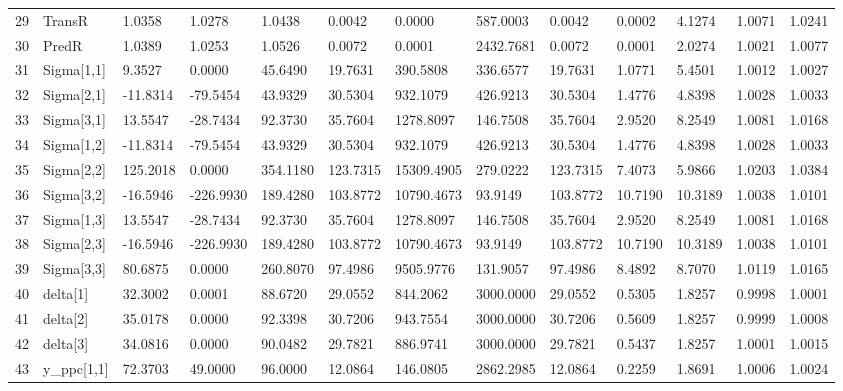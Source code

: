 \begin{table}[ht]
\begin{tabular}{rllllllllllll}
  29 & TransR &   1.0358 &    1.0278 &   1.0438 &   0.0042 &     0.0000 &  587.0003 &   0.0042 &  0.0002 &  4.1274 & 1.0071 &  1.0241 \\ 
  30 & PredR &   1.0389 &    1.0253 &   1.0526 &   0.0072 &     0.0001 & 2432.7681 &   0.0072 &  0.0001 &  2.0274 & 1.0021 &  1.0077 \\ 
  31 & Sigma[1,1] &   9.3527 &    0.0000 &  45.6490 &  19.7631 &   390.5808 &  336.6577 &  19.7631 &  1.0771 &  5.4501 & 1.0012 &  1.0027 \\ 
  32 & Sigma[2,1] & -11.8314 &  -79.5454 &  43.9329 &  30.5304 &   932.1079 &  426.9213 &  30.5304 &  1.4776 &  4.8398 & 1.0028 &  1.0033 \\ 
  33 & Sigma[3,1] &  13.5547 &  -28.7434 &  92.3730 &  35.7604 &  1278.8097 &  146.7508 &  35.7604 &  2.9520 &  8.2549 & 1.0081 &  1.0168 \\ 
  34 & Sigma[1,2] & -11.8314 &  -79.5454 &  43.9329 &  30.5304 &   932.1079 &  426.9213 &  30.5304 &  1.4776 &  4.8398 & 1.0028 &  1.0033 \\ 
  35 & Sigma[2,2] & 125.2018 &    0.0000 & 354.1180 & 123.7315 & 15309.4905 &  279.0222 & 123.7315 &  7.4073 &  5.9866 & 1.0203 &  1.0384 \\ 
  36 & Sigma[3,2] & -16.5946 & -226.9930 & 189.4280 & 103.8772 & 10790.4673 &   93.9149 & 103.8772 & 10.7190 & 10.3189 & 1.0038 &  1.0101 \\ 
  37 & Sigma[1,3] &  13.5547 &  -28.7434 &  92.3730 &  35.7604 &  1278.8097 &  146.7508 &  35.7604 &  2.9520 &  8.2549 & 1.0081 &  1.0168 \\ 
  38 & Sigma[2,3] & -16.5946 & -226.9930 & 189.4280 & 103.8772 & 10790.4673 &   93.9149 & 103.8772 & 10.7190 & 10.3189 & 1.0038 &  1.0101 \\ 
  39 & Sigma[3,3] &  80.6875 &    0.0000 & 260.8070 &  97.4986 &  9505.9776 &  131.9057 &  97.4986 &  8.4892 &  8.7070 & 1.0119 &  1.0165 \\ 
  40 & delta[1] &  32.3002 &    0.0001 &  88.6720 &  29.0552 &   844.2062 & 3000.0000 &  29.0552 &  0.5305 &  1.8257 & 0.9998 &  1.0001 \\ 
  41 & delta[2] &  35.0178 &    0.0000 &  92.3398 &  30.7206 &   943.7554 & 3000.0000 &  30.7206 &  0.5609 &  1.8257 & 0.9999 &  1.0008 \\ 
  42 & delta[3] &  34.0816 &    0.0000 &  90.0482 &  29.7821 &   886.9741 & 3000.0000 &  29.7821 &  0.5437 &  1.8257 & 1.0001 &  1.0015 \\ 
  43 & y\_ppc[1,1] &  72.3703 &   49.0000 &  96.0000 &  12.0864 &   146.0805 & 2862.2985 &  12.0864 &  0.2259 &  1.8691 & 1.0006 &  1.0024 \\ 

\end{tabular}
\end{table}
